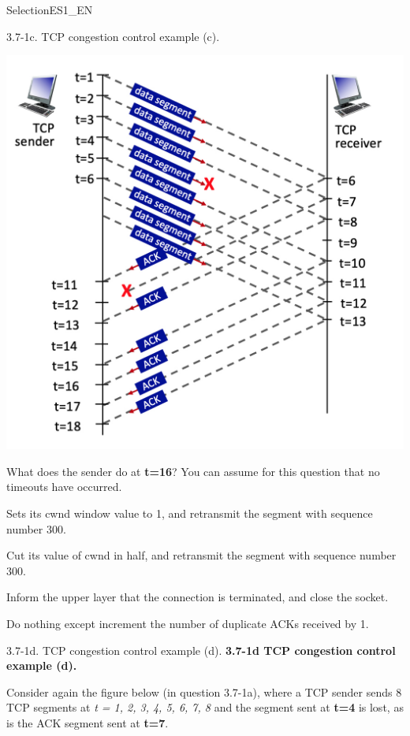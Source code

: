 \documentclass[a4paper]{article}
\begin{document}
\begin{quiz}{SelectionES1\_EN}
\begin{multi}[points=1,shuffle]{3.7-1c. TCP congestion control example (c).}
\begin{center}
	\includegraphics[width=\linewidth]{figs/tcp_seq_ack_1.jpg}
\end{center}

What does the sender do at \textbf{t=16}? You can assume for this question that no timeouts have occurred.
\item Sets its cwnd window value to 1, and retransmit the segment with sequence number 300.
\item Cut its value of cwnd in half, and retransmit the segment with sequence number 300.
\item Inform the upper layer that the connection is terminated, and close the socket.
\item* Do nothing except increment the number of duplicate ACKs received by 1.
\end{multi}

\begin{multi}[points=1,shuffle]{3.7-1d. TCP congestion control example (d).}
\textbf{3.7-1d TCP congestion control example (d).}

Consider again the figure below (in question 3.7-1a), where a TCP sender sends 8 TCP segments at \emph{t = 1, 2, 3, 4, 5, 6, 7, 8} and the segment sent at \textbf{t=4} is lost, as is the ACK segment sent at \textbf{t=7}. 


\end{multi}
\end{quiz}
\end{document}
